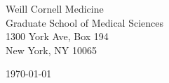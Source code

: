 \begin{minipage}{0.49\textwidth}
\begin{flushleft}
\noindent
Weill Cornell Medicine\\
Graduate School of Medical Sciences\\
1300 York Ave, Box 194\\
New York, NY 10065
\end{flushleft}
\end{minipage}
\begin{minipage}{0.47\textwidth}
\begin{flushright}
\today
\end{flushright}
\end{minipage} \\

\newcommand{\univ}{Cornell University}
\newcommand{\univshort}{Cornell}
\newcommand{\degree}{Tri-I PhD}
\newcommand{\dept}{Computational Biology and Medicine}

